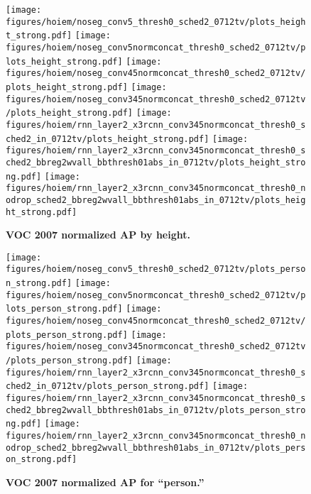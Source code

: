 \begin{figure}[t]
  \begin{center}
   \texttt{[image: figures/hoiem/noseg\_conv5\_thresh0\_sched2\_0712tv/plots\_height\_strong.pdf]}
   \texttt{[image: figures/hoiem/noseg\_conv5normconcat\_thresh0\_sched2\_0712tv/plots\_height\_strong.pdf]}
   \texttt{[image: figures/hoiem/noseg\_conv45normconcat\_thresh0\_sched2\_0712tv/plots\_height\_strong.pdf]}
   \texttt{[image: figures/hoiem/noseg\_conv345normconcat\_thresh0\_sched2\_0712tv/plots\_height\_strong.pdf]}
   \texttt{[image: figures/hoiem/rnn\_layer2\_x3rcnn\_conv345normconcat\_thresh0\_sched2\_in\_0712tv/plots\_height\_strong.pdf]}
   \texttt{[image: figures/hoiem/rnn\_layer2\_x3rcnn\_conv345normconcat\_thresh0\_sched2\_bbreg2wvall\_bbthresh01abs\_in\_0712tv/plots\_height\_strong.pdf]}
   \texttt{[image: figures/hoiem/rnn\_layer2\_x3rcnn\_conv345normconcat\_thresh0\_nodrop\_sched2\_bbreg2wvall\_bbthresh01abs\_in\_0712tv/plots\_height\_strong.pdf]}
  \end{center}
  \vspace{-12pt}
  \caption{\textbf{VOC 2007 normalized AP by height.}
  }
  \label{fig:hoiem}
\end{figure}

\begin{figure}[t]
  \begin{center}
   \texttt{[image: figures/hoiem/noseg\_conv5\_thresh0\_sched2\_0712tv/plots\_person\_strong.pdf]}
   \texttt{[image: figures/hoiem/noseg\_conv5normconcat\_thresh0\_sched2\_0712tv/plots\_person\_strong.pdf]}
   \texttt{[image: figures/hoiem/noseg\_conv45normconcat\_thresh0\_sched2\_0712tv/plots\_person\_strong.pdf]}
   \texttt{[image: figures/hoiem/noseg\_conv345normconcat\_thresh0\_sched2\_0712tv/plots\_person\_strong.pdf]}
   \texttt{[image: figures/hoiem/rnn\_layer2\_x3rcnn\_conv345normconcat\_thresh0\_sched2\_in\_0712tv/plots\_person\_strong.pdf]}
   \texttt{[image: figures/hoiem/rnn\_layer2\_x3rcnn\_conv345normconcat\_thresh0\_sched2\_bbreg2wvall\_bbthresh01abs\_in\_0712tv/plots\_person\_strong.pdf]}
   \texttt{[image: figures/hoiem/rnn\_layer2\_x3rcnn\_conv345normconcat\_thresh0\_nodrop\_sched2\_bbreg2wvall\_bbthresh01abs\_in\_0712tv/plots\_person\_strong.pdf]}
  \end{center}
  \vspace{-12pt}
  \caption{\textbf{VOC 2007 normalized AP for ``person.''}
  }
  \label{fig:hoiem}
\end{figure}

